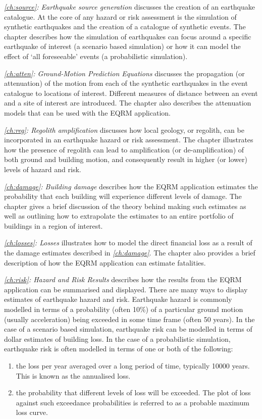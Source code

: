 \textit{\cref{ch:source}: Earthquake source generation} discusses
the creation of an earthquake catalogue. At the core of any hazard
or risk assessment is the simulation of synthetic earthquakes and
the creation of a catalogue of synthetic events. The chapter
describes how the simulation of earthquakes can focus around a
specific earthquake of interest (a scenario based simulation) or
how it can model the effect of `all foreseeable' events (a
probabilistic simulation).

\textit{\cref{ch:atten}: Ground-Motion Prediction Equations} discusses
the propagation (or attenuation) of the motion from each of the
synthetic earthquakes in the event catalogue to locations of interest.
Different measures of distance between an event and a site of interest
are introduced. The chapter also describes the attenuation models that
can be used with the EQRM application.

\textit{\cref{ch:reg}: Regolith amplification} discusses how local
geology, or regolith, can be incorporated in an earthquake hazard
or risk assessment. The chapter illustrates how the presence of
regolith can lead to amplification (or de-amplification) of both
ground and building motion, and consequently result in higher (or
lower) levels of hazard and risk.

\textit{\cref{ch:damage}: Building damage} describes how the EQRM
application estimates the probability that each building will
experience different levels of damage. The chapter gives a brief
discussion of the theory behind making such estimates as well as
outlining how to extrapolate the estimates to an entire portfolio
of buildings in a region of interest.

\textit{\cref{ch:losses}: Losses} illustrates how to model the
direct financial loss as a result of the damage estimates
described in \textit{\cref{ch:damage}}. The chapter also provides
a brief description of how the EQRM application can estimate
fatalities.

\textit{\cref{ch:risk}: Hazard and Risk Results}
describes how the results from the EQRM application can be
summarised and displayed. There are many ways to display estimates
of earthquake hazard and risk. Earthquake hazard is commonly
modelled in terms of a probability (often 10\%) of a particular
ground motion (usually acceleration) being exceeded in some time
frame (often 50 years). In the case of a scenario based
simulation, earthquake risk can be modelled in terms of dollar
estimates of building loss. In the case of a probabilistic simulation,
earthquake risk is often modelled in terms of one or both of the
following:
\begin{enumerate}
\item the loss per year averaged over a long period of time,
typically 10000 years. This is known as the annualised loss. \item
the probability that different levels of loss will be exceeded.
The plot of loss against such exceedance probabilities is referred
to as a probable maximum loss curve.
\end{enumerate}

